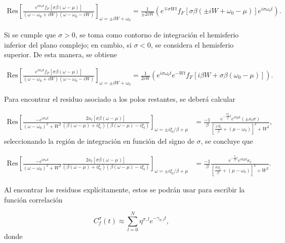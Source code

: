 \begin{appendixs}
\begin{align*}
   \text{Res} \left[ \frac{e^{ i\sigma \omega t} f_{F}[\sigma \beta (\omega-\mu)] }{ (\omega-\omega_{0} + iW)(\omega -\omega_{0} -iW)}\right]_{\omega = \pm i W + \omega_{0}} = \frac{1}{\pm 2iW} ( e^{\mp \sigma Wt} f_{F}[\sigma \beta(\pm iW +\omega_{0}-\mu)]e^{i\sigma \omega_{0}t}). 
\end{align*}

Si se cumple que $\sigma > 0$, se toma como contorno de integración el hemisferio inferior del plano complejo; en cambio, si $\sigma < 0$, se considera el hemisferio superior. De esta manera, se obtiene

\begin{align*}
    \text{Res} \left[ \frac{e^{ i\sigma \omega t} f_{F}[\sigma \beta (\omega-\mu)] }{ (\omega-\omega_{0} + iW)(\omega -\omega_{0} -iW)}\right]_{\omega = \pm i W + \omega_{0}} = \frac{1}{ 2iW} ( e^{i\sigma \omega_{0}t}e^{- Wt} f_{F}[i\beta W + \sigma \beta(\omega_{0}-\mu)]). 
 \end{align*}

Para encontrar el residuo asociado a los polos restantes, se deberá calcular

\begin{align*}
    \text{Res} \left[ \frac{-e^{i\sigma \omega t}}{(\omega - \omega_{0})^{2} + W^{2} } \frac{ 2\kappa_{l}[\sigma \beta (\omega-\mu)] }{ (\beta(\omega-\mu) + i \xi_{l} )(\beta(\omega-\mu) - i \xi_{l})} \right]_{\omega = \pm i \xi_{l}/\beta + \mu} & = \frac{-1}{\beta} \frac{e^{- \frac{\sigma \xi_{l}}{\beta}t} e^{i\sigma \mu t}(\pm \kappa_{l}\sigma )}{ [ \frac{ \pm i\xi_{l}}{\beta} + (\mu - \omega_{0}) ]^{2} + W^{2} } ,
\end{align*}
seleccionando la región de integración en función del signo de $\sigma$, se concluye que

\begin{align*}
    \text{Res} \left[ \frac{-e^{i\sigma \omega t}}{(\omega - \omega_{0})^{2} + W^{2} } \frac{ 2\kappa_{l}[\sigma \beta (\omega-\mu)] }{ (\beta(\omega-\mu) + i \xi_{l} )(\beta(\omega-\mu) - i \xi_{l})} \right]_{\omega = \pm i \xi_{l}/\beta + \mu} & = \frac{-1}{\beta} \frac{e^{- \frac{ \xi_{l}}{\beta}t} e^{i\sigma \mu t} \kappa_{l} }{ [ \frac{ \sigma i\xi_{l}}{\beta} + (\mu - \omega_{0}) ]^{2} + W^{2} }. 
\end{align*}

Al encontrar los residuos explícitamente, estos se podrán usar para escribir la función correlación 

\begin{equation}
    C^{\sigma}_{f}(t) \approx \sum_{l=0}^{N} \eta^{\sigma,l} e^{-\gamma_{\sigma,l} t},
    \label{correlationf}
\end{equation}
donde 


\end{appendixs}
